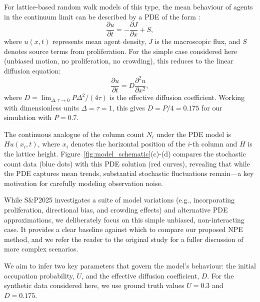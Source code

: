\documentclass{article}
\begin{document}
For lattice-based random walk models of this type, the mean behaviour of agents in the continuum limit can be described by a PDE of the form \citep{Codling2008,Simpson2025.05.25.656057,Plank2025}:
\begin{equation}
	\frac{\partial u}{\partial t} = -\frac{\partial J}{\partial x} + S,
\end{equation}
where $u(x,t)$ represents mean agent density, $J$ is the macroscopic flux, and $S$ denotes source terms from proliferation. For the simple case considered here (unbiased motion, no proliferation, no crowding), this reduces to the linear diffusion equation:
\begin{equation}
	\frac{\partial u}{\partial t} = D\frac{\partial^2 u}{\partial x^2},
\end{equation}
where $D = \lim_{\Delta,\tau \to 0} P\Delta^2/(4\tau)$ is the effective diffusion coefficient. Working with dimensionless units $\Delta=\tau=1$, this gives $D=P/4=0.175$ for our simulation with $P=0.7$.

The continuous analogue of the column count $N_i$ under the PDE model is $Hu(x_i,t)$, where $x_i$ denotes the horizontal position of the $i$-th column and $H$ is the lattice height. Figure~\ref{fig:model_schematic}(c)-(d) compares the stochastic count data (blue dots) with this PDE solution (red curves), revealing that while the PDE captures mean trends, substantial stochastic fluctuations remain—a key motivation for carefully modeling observation noise.

While S\&P2025 investigates a suite of model variations (e.g., incorporating proliferation, directional bias, and crowding effects) and alternative PDE approximations, we deliberately focus on this simple unbiased, non-interacting case. It provides a clear baseline against which to compare our proposed NPE method, and we refer the reader to the original study for a fuller discussion of more complex scenarios.

We aim to infer two key parameters that govern the model's behaviour: the initial occupation probability, $U$, and the effective diffusion coefficient, $D$. For the synthetic data considered here, we use ground truth values $U=0.3$ and $D=0.175$. 
\end{document}
